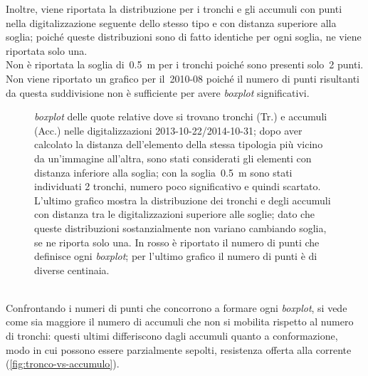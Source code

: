 Inoltre, viene riportata la distribuzione per i tronchi e gli accumuli con punti nella digitalizzazione seguente dello stesso tipo e con distanza superiore alla soglia; poiché queste distribuzioni sono di fatto identiche per ogni soglia, ne viene riportata solo una.
\\
Non è riportata la soglia di~\SI{0.5}{\m} per i tronchi poiché sono presenti solo~2 punti.
Non viene riportato un grafico per il~2010-08 poiché il numero di punti risultanti da questa suddivisione non è sufficiente per avere \emph{boxplot} significativi.
%
\begin{figure}
	\centering
	
	\caption[\emph{boxplot} delle quote relative distinte per tronchi e accumuli legnosi]{\emph{boxplot} delle quote relative dove si trovano tronchi (Tr.) e accumuli (Acc.) nelle digitalizzazioni 2013-10-22/2014-10-31; dopo aver calcolato la distanza dell'elemento della stessa tipologia più vicino da un'immagine all'altra, sono stati considerati gli elementi con distanza inferiore alla soglia; con la soglia~\SI{0.5}{\m} sono stati individuati \num{2} tronchi, numero poco significativo e quindi scartato.
	L'ultimo grafico mostra la distribuzione dei tronchi e degli accumuli con distanza tra le digitalizzazioni superiore alle soglie; dato che queste distribuzioni sostanzialmente non variano cambiando soglia, se ne riporta solo una.
	In rosso è riportato il numero di punti che definisce ogni \emph{boxplot}; per l'ultimo grafico il numero di punti è di diverse centinaia.}
	\label{graph:legno-wj-dem-detrended-distanza}
\end{figure}
%
\\
Confrontando i numeri di punti che concorrono a formare ogni \emph{boxplot}, si vede come sia maggiore il numero di accumuli che non si mobilita rispetto al numero di tronchi: questi ultimi differiscono dagli accumuli quanto a conformazione, modo in cui possono essere parzialmente sepolti, resistenza offerta alla corrente (\cref{fig:tronco-vs-accumulo}).
%
